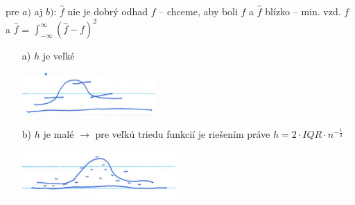 \documentclass[unknownkeysallowed]{article}
\begin{document}
pre $a)$ aj $b)$: $\hat{f}$ nie je dobrý odhad $f$ -- chceme, aby boli $f$ a $\hat{f}$ blízko -- min. vzd. $f$ a $\hat{f}$ = $\int_{-\infty}^{\infty}{(\hat{f}-f)^2}$
\begin{enumerate}
\item[a)] $h$ je veľké

\includegraphics[width=0.5\linewidth]{imgs/obr6.png}
\item[b)] $h$ je malé $\to$ pre veľkú triedu funkcií je riešením práve $h=2\cdot IQR\cdot n^{-\frac{1}{3}}$

\includegraphics[width=0.5\linewidth]{imgs/obr7.png}
\end{enumerate}
\end{document}
